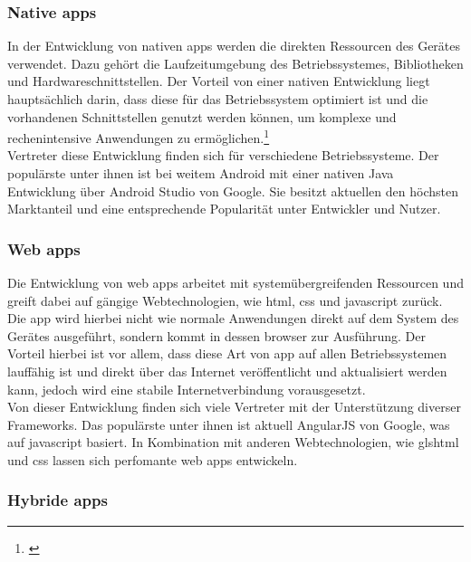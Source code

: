 \subsubsection{Native \glspl{app}}

In der Entwicklung von nativen \glspl{app} werden die direkten Ressourcen des Gerätes verwendet. Dazu gehört die Laufzeitumgebung des Betriebssystemes, Bibliotheken und Hardwareschnittstellen. Der Vorteil von einer nativen Entwicklung liegt hauptsächlich darin, dass diese für das Betriebssystem optimiert ist und die vorhandenen Schnittstellen genutzt werden können, um komplexe und rechenintensive Anwendungen zu ermöglichen.\footnote{\citep[vgl.][Unterschiede und Vergleich native Apps vs. Web Apps]{DanielWurstl.Unterschiedeund}\label{note1}}\\
Vertreter diese Entwicklung finden sich für verschiedene Betriebssysteme. Der populärste unter ihnen ist bei weitem Android mit einer nativen Java Entwicklung über Android Studio von Google. Sie besitzt aktuellen den höchsten Marktanteil und eine entsprechende Popularität unter Entwickler und Nutzer.

\subsubsection{Web \glspl{app}}

Die Entwicklung von web \glspl{app} arbeitet mit systemübergreifenden Ressourcen und greift dabei auf gängige Webtechnologien, wie \gls{html}, \gls{css} und \gls{javascript} zurück. Die \gls{app} wird hierbei nicht wie normale Anwendungen direkt auf dem System des Gerätes ausgeführt, sondern kommt in dessen \gls{browser} zur Ausführung. Der Vorteil hierbei ist vor allem, dass diese Art von \gls{app} auf allen Betriebssystemen lauffähig ist und direkt über das Internet veröffentlicht und aktualisiert werden kann, jedoch wird eine stabile Internetverbindung vorausgesetzt.\\
Von dieser Entwicklung finden sich viele Vertreter mit der Unterstützung diverser Frameworks. Das populärste unter ihnen ist aktuell AngularJS von Google, was auf \gls{javascript} basiert. In Kombination mit anderen Webtechnologien, wie gls{html} und \gls{css} lassen sich perfomante web \glspl{app} entwickeln.

\subsubsection{Hybride \glspl{app}}

